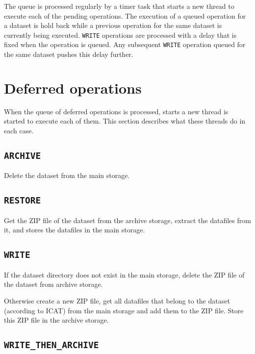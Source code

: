 \documentclass[paper=a4]{scrartcl}
\begin{document}
The queue is processed regularly by a timer task that starts a new
thread to execute each of the pending operations.  The execution of a
queued operation for a dataset is hold back while a previous operation
for the same dataset is currently being executed.  \texttt{WRITE}
operations are processed with a delay that is fixed when the operation
is queued.  Any subsequent \texttt{WRITE} operation queued for the
same dataset pushes this delay further.


\section{Deferred operations}
\label{sec:defops}

When the queue of deferred operations is processed, starts a new
thread is started to execute each of them.  This section describes
what these threads do in each case.

\subsection{\texttt{ARCHIVE}}
\label{sec:defops:archive}

Delete the dataset from the main storage.

\subsection{\texttt{RESTORE}}
\label{sec:defops:restore}

Get the ZIP file of the dataset from the archive storage, extract the
datafiles from it, and stores the datafiles in the main storage.

\subsection{\texttt{WRITE}}
\label{sec:defops:write}

If the dataset directory does not exist in the main storage, delete
the ZIP file of the dataset from archive storage.

Otherwise create a new ZIP file, get all datafiles that belong to the
dataset (according to ICAT) from the main storage and add them to the
ZIP file.  Store this ZIP file in the archive storage.

\subsection{\texttt{WRITE\_THEN\_ARCHIVE}}
\label{sec:defops:writethenarchive}
\end{document}

